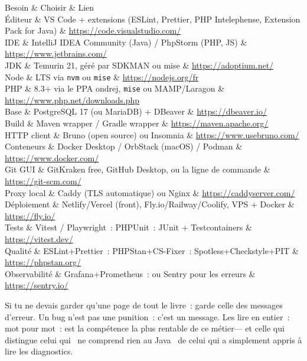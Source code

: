 \begin{tablez}
  \headrow Besoin \& Choisir \& Lien \\
  \midrule
  \'Editeur \& VS Code + extensions (ESLint, Prettier, PHP Intelephense, Extension Pack for Java) \& \url{https://code.visualstudio.com/} \\
  IDE \& IntelliJ IDEA Community (Java) / PhpStorm (PHP, JS) \& \url{https://www.jetbrains.com/} \\
  JDK \& Temurin 21, g\'er\'e par SDKMAN ou mise \& \url{https://adoptium.net/} \\
  Node \& LTS via \verb|nvm| ou \verb|mise| \& \url{https://nodejs.org/fr} \\
  PHP \& 8.3+ via le PPA ondrej, \verb|mise| ou MAMP/Laragon \& \url{https://www.php.net/downloads.php} \\
  Base \& PostgreSQL 17 (ou MariaDB) + DBeaver \& \url{https://dbeaver.io/} \\
  Build \& Maven wrapper / Gradle wrapper \& \url{https://maven.apache.org/} \\
  HTTP client \& Bruno (open source) ou Insomnia \& \url{https://www.usebruno.com/} \\
  Conteneurs \& Docker Desktop / OrbStack (macOS) / Podman \& \url{https://www.docker.com/} \\
  Git GUI \& GitKraken free, GitHub Desktop, ou la ligne de commande \& \url{https://git-scm.com/} \\
  Proxy local \& Caddy (TLS automatique) ou Nginx \& \url{https://caddyserver.com/} \\
  D\'eploiement \& Netlify/Vercel (front), Fly.io/Railway/Coolify, VPS + Docker \& \url{https://fly.io/} \\
  Tests \& Vitest / Playwright~: PHPUnit~: JUnit + Testcontainers \& \url{https://vitest.dev/} \\
  Qualit\'e \& ESLint+Prettier~: PHPStan+CS-Fixer~: Spotless+Checkstyle+PIT \& \url{https://phpstan.org/} \\
  Observabilit\'e \& Grafana+Prometheus~: ou Sentry pour les erreurs \& \url{https://sentry.io/} \\
\end{tablez}

\begin{note}
Si tu ne devais garder qu'une page de tout le livre~: garde celle des messages d'erreur. Un bug
n'est pas une punition~: c'est un message. Les lire en entier~: mot pour mot~: est la comp\'etence
la plus rentable de ce m\'etier--- et celle qui distingue celui qui \og ~ne comprend rien au Java~ \fg{}
de celui qui a simplement appris \`a lire les diagnostics.
\end{note}

